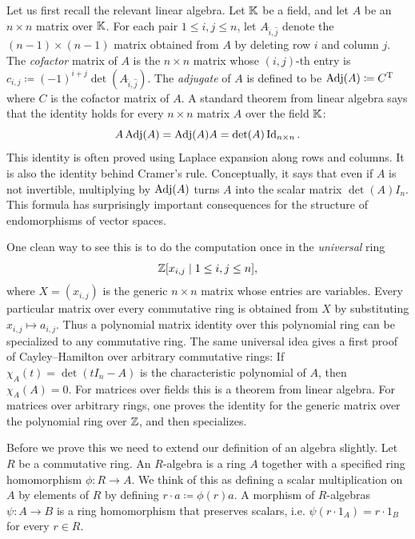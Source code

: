 \documentclass[Notebook.tex]{subfiles}
\begin{document}
Let us first recall the relevant linear algebra. Let $\mathbb K$ be a field, and let $A$ be an $n \times n$ matrix over $\mathbb K$. For each pair $1 \leq i,j \leq n$, let $A_{\hat{i},\hat{j}}$ denote the $(n-1)\times(n-1)$ matrix obtained from $A$ by deleting row $i$ and column $j$. The \emph{cofactor} matrix of $A$ is the $n\times n$ matrix whose $(i,j)$-th entry is $c_{i,j}\coloneqq (-1)^{i+j}\det(A_{\hat{i},\hat{j}})$. The \emph{adjugate} of $A$ is defined to be $\operatorname{\text{Adj}}(A)\coloneqq C^{\text{T}}$ where $C$ is the cofactor matrix of $A$. A standard theorem from linear algebra says that the identity holds for every $n\times n$ matrix $A$ over the field $\mathbb K$:
\[
A\operatorname{\text{Adj}}(A) = \operatorname{\text{Adj}}(A)A=\det(A)\operatorname{Id}_{n \times n}.
\] 
This identity is often proved using Laplace expansion along rows and columns. It is also the identity behind Cramer's rule. Conceptually, it says that even if
$A$ is not invertible, multiplying by $\operatorname{\text{Adj}}(A)$ turns $A$ into the scalar matrix $\det(A)I_n$. This formula has surprisingly important consequences for the structure of endomorphisms of vector spaces.

One clean way to see this is to do the computation once in the \emph{universal} ring
\[
\mathbb Z[x_{i,j}\mid 1\leq i,j\leq n],
\]
where $X=(x_{i,j})$ is the generic $n\times n$ matrix whose entries are variables. Every particular matrix over every commutative ring is obtained from $X$ by substituting $x_{i,j}\mapsto a_{i,j}$. Thus a polynomial matrix identity over this polynomial ring can be specialized to any commutative ring. The same universal idea gives a first proof of Cayley--Hamilton over arbitrary commutative rings: If $\chi_A(t)=\det(tI_n-A)$ is the characteristic polynomial of $A$, then $\chi_A(A)=0$. For matrices over fields this is a theorem from linear algebra. For matrices over arbitrary rings, one proves the identity for the generic matrix over the polynomial ring over $\mathbb Z$, and then specializes.

Before we prove this we need to extend our definition of an algebra slightly. Let $R$ be a commutative ring. An $R$-algebra is a ring $A$ together with a specified ring homomorphism $\phi:R \to A$.  We think of this as defining a scalar multiplication on $A$ by elements of $R$ by defining $r\cdot a \coloneqq \phi(r)a$. A morphism of $R$-algebras $\psi:A\to B$ is a ring homomorphism that preserves scalars, i.e. $\psi(r\cdot 1_A)=r\cdot 1_B$ for every $r\in R$.

\hrulefill
\end{document}
